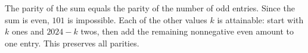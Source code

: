 The parity of the sum equals the parity of the number of odd entries. Since the sum is even, $\boxed{101}$ is impossible. Each of the other values $k$ is attainable: start with $k$ ones and $2024-k$ twos, then add the remaining nonnegative even amount to one entry. This preserves all parities.
